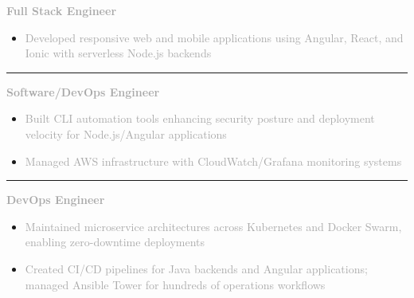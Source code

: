 \documentclass[10pt,letterpaper]{article}
\newcommand{\companyHeader}[2]{%
    \vspace{5pt}
    \noindent\textcolor{#2}{\rule{3pt}{10pt}}\hspace{6pt}{\headingfont\normalsize\textbf{\textcolor{darkgray}{#1}}}
    \vspace{2pt}
}
\newcommand{\positionHeader}[2]{%
    \noindent\textbf{\textcolor{darkgray}{#2}}\hspace{4pt}{\footnotesize\textcolor{mediumgray}{//}}\hspace{4pt}{\footnotesize\itshape\textcolor{mediumgray}{#1}}
    \vspace{1pt}
}
\begin{document}
\begin{minipage}[t][10.5in][t]{5.3in}
\begin{minipage}{4.7in}
\vspace{2pt}

\positionHeader{2022}{Full Stack Engineer}
\begin{itemize}
    \setlength\itemsep{1pt}
    \item\small\textcolor{darkgray}{Developed responsive web and mobile applications using Angular, React, and Ionic with serverless Node.js backends}
\end{itemize}

\companyHeader{Triblio}{company2}

\positionHeader{2021–2022}{Software/DevOps Engineer}
\begin{itemize}
    \setlength\itemsep{1pt}
    \item\small\textcolor{darkgray}{Built CLI automation tools enhancing security posture and deployment velocity for Node.js/Angular applications}
    \item\small\textcolor{darkgray}{Managed AWS infrastructure with CloudWatch/Grafana monitoring systems}
\end{itemize}

\companyHeader{Accenture Federal Services}{company3}

\positionHeader{2018–2021}{DevOps Engineer}
\begin{itemize}
    \setlength\itemsep{1pt}
    \item\small\textcolor{darkgray}{Maintained microservice architectures across Kubernetes and Docker Swarm, enabling zero-downtime deployments}
    \item\small\textcolor{darkgray}{Created CI/CD pipelines for Java backends and Angular applications; managed Ansible Tower for hundreds of operations workflows}
\end{itemize}

\end{minipage}
\end{minipage}
\end{document}
